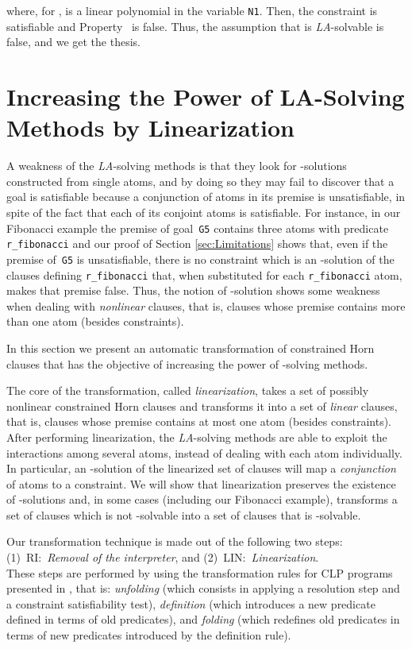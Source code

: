 \documentclass[english]{tlp}
\newcommand{\tts}{\tt \small}
\newcommand{\eop}{\hfill}
\begin{document}
\noindent
where, for ,  is a linear polynomial in the variable  {\tt N1}.
Then, the constraint  is satisfiable
and Property~ is false. Thus, 
the assumption 
that   is {\textit {LA}}-solvable is false,
and we get the thesis.
\hfill\eop

\section{Increasing the Power of LA-Solving Methods by Linearization}
\label{sec:transform}



A weakness of the {\it LA}-solving methods
is that they look for -solutions constructed from single atoms, 
and by doing so they may fail to discover that a goal is satisfiable 
because a conjunction of atoms in its premise is unsatisfiable,
in spite of the fact that {each of its conjoint atoms is} satisfiable.
For instance, in our Fibonacci example  the premise of 
goal~{\tt G5} contains three atoms with predicate {\tts r\_fibonacci} and our proof
of Section \ref{sec:Limitations} shows that, even if the premise of~{\tt G5}
is unsatisfiable, there is no constraint which is an -solution of the 
clauses defining
{\tts r\_fibonacci} that, when substituted for each {\tts r\_fibonacci} atom, 
makes that premise false.
Thus, the notion of -solution
shows some weakness when dealing with 
{\it nonlinear} clauses, that is, clauses whose premise 
contains more than one atom (besides constraints).

In this section we present an automatic transformation of
constrained Horn clauses that has the objective of increasing the power of
 -solving methods. 
 
The core of the transformation, called {\it linearization}, 
takes a set of possibly 
nonlinear constrained Horn clauses and transforms it
 into a set of {\it linear} clauses,
that is, clauses whose premise contains at most one atom (besides constraints).
After performing linearization, the {\it LA}-solving methods are able
to exploit the interactions among several atoms,
instead of dealing with each atom individually.
In particular, an -solution of the linearized set of clauses
will map a {\it conjunction} of atoms
to a constraint.
We will show that {\rm linearization} preserves the existence of 
 -solutions and,
in some cases (including our Fibonacci example), transforms a set of clauses 
which is not -solvable into a set of clauses that is 
-solvable.


Our transformation technique is made out of the following two steps:\\
(1)~RI:~{\it Removal of the interpreter}, and
(2)~LIN:~{\it Linearization}.\\ 
These steps
 are performed by using the 
transformation rules for CLP programs presented in \cite{EtG96}, that is:
 {\it unfolding} (which consists in applying a resolution step
and a constraint satisfiability test), {\it definition} (which 
introduces a new predicate defined in terms of old predicates), 
and {\it folding} (which redefines old predicates
in terms of new predicates introduced by the definition rule).
\end{document}
